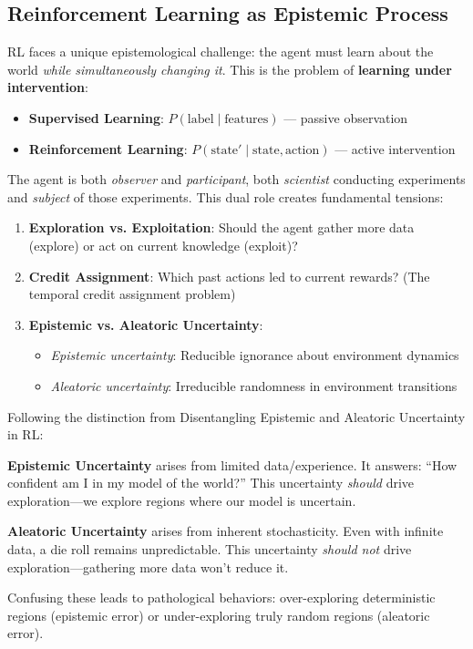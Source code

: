 \subsection{Reinforcement Learning as Epistemic Process}

RL faces a unique epistemological challenge: the agent must learn about the world \textit{while simultaneously changing it}. This is the problem of \textbf{learning under intervention}:

\begin{itemize}
    \item \textbf{Supervised Learning}: $P(\text{label} \mid \text{features})$ --- passive observation
    \item \textbf{Reinforcement Learning}: $P(\text{state}' \mid \text{state}, \text{action})$ --- active intervention
\end{itemize}

The agent is both \textit{observer} and \textit{participant}, both \textit{scientist} conducting experiments and \textit{subject} of those experiments. This dual role creates fundamental tensions:

\begin{enumerate}
    \item \textbf{Exploration vs. Exploitation}: Should the agent gather more data (explore) or act on current knowledge (exploit)?
    
    \item \textbf{Credit Assignment}: Which past actions led to current rewards? (The temporal credit assignment problem)
    
    \item \textbf{Epistemic vs. Aleatoric Uncertainty}: 
    \begin{itemize}
        \item \textit{Epistemic uncertainty}: Reducible ignorance about environment dynamics
        \item \textit{Aleatoric uncertainty}: Irreducible randomness in environment transitions
    \end{itemize}
\end{enumerate}

\begin{remark}
Following the distinction from Disentangling Epistemic and Aleatoric Uncertainty in RL:

\textbf{Epistemic Uncertainty} arises from limited data/experience. It answers: ``How confident am I in my model of the world?'' This uncertainty \textit{should} drive exploration---we explore regions where our model is uncertain.

\textbf{Aleatoric Uncertainty} arises from inherent stochasticity. Even with infinite data, a die roll remains unpredictable. This uncertainty \textit{should not} drive exploration---gathering more data won't reduce it.

Confusing these leads to pathological behaviors: over-exploring deterministic regions (epistemic error) or under-exploring truly random regions (aleatoric error).
\end{remark}

